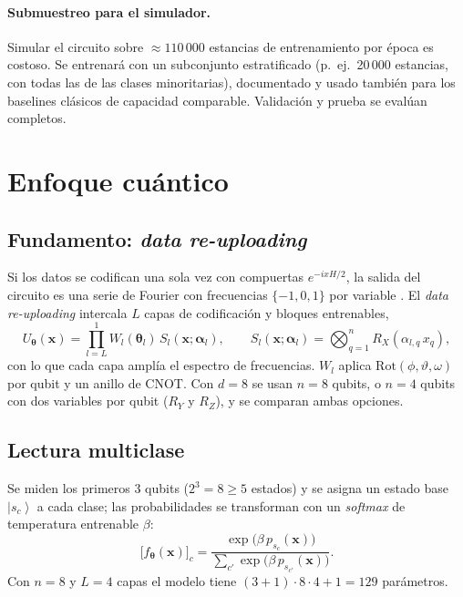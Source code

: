 \documentclass[11pt,letterpaper]{article}
\providecommand{\ket}[1]{\left|#1\right\rangle}
\begin{document}
\paragraph{Submuestreo para el simulador.} Simular el circuito sobre $\approx110\,000$ estancias de
entrenamiento por época es costoso. Se entrenará con un subconjunto estratificado (p.\ ej.\ 20\,000
estancias, con todas las de las clases minoritarias), documentado y usado también para los baselines
clásicos de capacidad comparable. Validación y prueba se evalúan completos.

\section{Enfoque cuántico}
\subsection{Fundamento: \emph{data re-uploading}}
Si los datos se codifican una sola vez con compuertas $e^{-ixH/2}$, la salida del circuito es una
serie de Fourier con frecuencias $\{-1,0,1\}$ por variable \cite{schuld2021}. El \emph{data
re-uploading} \cite{perez2020} intercala $L$ capas de codificación y bloques entrenables,
\begin{equation}
U_{\bm\theta}(\bm{x})=\prod_{l=L}^{1}W_l(\bm\theta_l)\,S_l(\bm{x};\bm\alpha_l),\qquad
S_l(\bm{x};\bm\alpha_l)=\bigotimes_{q=1}^{n}R_X(\alpha_{l,q}\,x_q),
\end{equation}
con lo que cada capa amplía el espectro de frecuencias. $W_l$ aplica $\mathrm{Rot}(\phi,\vartheta,\omega)$
por qubit y un anillo de CNOT. Con $d=8$ se usan $n=8$ qubits, o $n=4$ qubits con dos variables por
qubit ($R_Y$ y $R_Z$), y se comparan ambas opciones.

\subsection{Lectura multiclase}
Se miden los primeros 3 qubits ($2^3=8\geq5$ estados) y se asigna un estado base $\ket{s_c}$ a cada
clase; las probabilidades se transforman con un \emph{softmax} de temperatura entrenable $\beta$:
\begin{equation}
\big[f_{\bm\theta}(\bm{x})\big]_c=\frac{\exp\!\big(\beta\,p_{s_c}(\bm{x})\big)}
{\sum_{c'}\exp\!\big(\beta\,p_{s_{c'}}(\bm{x})\big)}.
\end{equation}
Con $n=8$ y $L=4$ capas el modelo tiene $(3+1)\cdot8\cdot4+1=129$ parámetros.
\end{document}
